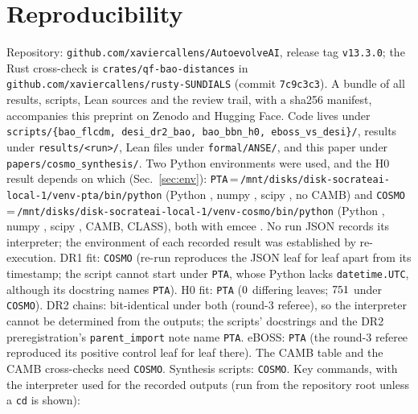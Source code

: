 \documentclass[11pt]{article}
\begin{document}
\section{Reproducibility}
Repository: \nolinkurl{github.com/xaviercallens/AutoevolveAI}, release tag \texttt{v13.3.0}; the Rust cross-check is \texttt{crates/qf-bao-distances} in
\nolinkurl{github.com/xaviercallens/rusty-SUNDIALS} (commit \texttt{7c9c3c3}). A bundle of all results, scripts, Lean sources and the review trail, with a
sha256 manifest, accompanies this preprint on Zenodo and Hugging Face. Code lives under \texttt{scripts/\{bao\_flcdm, desi\_dr2\_bao, bao\_bbn\_h0, eboss\_vs\_desi\}/}, results under \texttt{results/<run>/},
Lean files under \texttt{formal/ANSE/}, and this paper under \texttt{papers/cosmo\_synthesis/}. Two Python environments were used, and the H0 result
depends on which (Sec.~\ref{sec:env}): \texttt{PTA}\,=\,\nolinkurl{/mnt/disks/disk-socrateai-local-1/venv-pta/bin/python} (Python \evPtaPy, numpy \evPtaNp, scipy \evPtaSp, no CAMB) and
\texttt{COSMO}\,=\,\nolinkurl{/mnt/disks/disk-socrateai-local-1/venv-cosmo/bin/python} (Python \evCosPy, numpy \evCosNp, scipy \evCosSp, CAMB, CLASS), both with emcee \evEmcee.
No run JSON records its interpreter; the environment of each recorded result was established by re-execution. DR1 fit: \texttt{COSMO} (re-run reproduces the JSON
leaf for leaf apart from its timestamp; the script cannot start under \texttt{PTA}, whose Python lacks \texttt{datetime.UTC}, although its docstring names \texttt{PTA}).
H0 fit: \texttt{PTA} ($0$ differing leaves; $751$ under \texttt{COSMO}). DR2 chains: bit-identical under both (round-3 referee), so the interpreter cannot be
determined from the outputs; the scripts' docstrings and the DR2 preregistration's \texttt{parent\_import} note name \texttt{PTA}. eBOSS: \texttt{PTA} (the round-3
referee reproduced its positive control leaf for leaf there). The CAMB table and the CAMB cross-checks need \texttt{COSMO}. Synthesis scripts: \texttt{COSMO}. Key commands, with the
interpreter used for the recorded outputs (run from the repository root unless a \texttt{cd} is shown):
\end{document}
